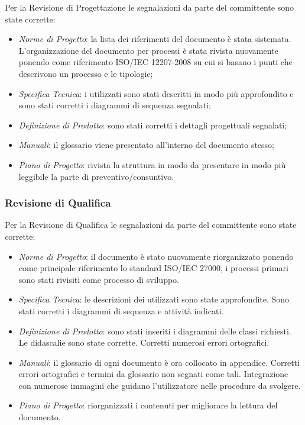 		Per la Revisione di Progettazione le segnalazioni da parte del committente sono state corrette:
		
		\begin{itemize}
			\item \emph{Norme di Progetto}: la lista dei riferimenti del documento è stata sistemata. L'organizzazione del documento per processi è stata rivista nuovamente ponendo come riferimento ISO/IEC 12207-2008 su cui si basano i punti che descrivono un processo e le tipologie;
			\item \emph{Specifica Tecnica}: i  utilizzati sono stati descritti in modo più approfondito e sono stati corretti i diagrammi di sequenza segnalati;
			\item \emph{Definizione di Prodotto}: sono stati corretti i dettagli progettuali segnalati;
			\item \emph{Manuali}: il glossario viene presentato all'interno del documento stesso;
			\item \emph{Piano di Progetto}: rivista la struttura in modo da presentare in modo più leggibile la parte di preventivo/consuntivo.
		\end{itemize}

		\subsubsection{Revisione di Qualifica}
		
		Per la Revisione di Qualifica le segnalazioni da parte del committente sono state corrette:
		
		\begin{itemize}
			\item \emph{Norme di Progetto}: il documento è stato nuovamente riorganizzato ponendo come principale riferimento lo standard ISO/IEC 27000, i processi primari sono stati rivisiti come processo di sviluppo.
			\item \emph{Specifica Tecnica}: le descrizioni dei  utilizzati sono state approfondite. Sono stati corretti i diagrammi di sequenza e attività indicati.
			\item \emph{Definizione di Prodotto}: sono stati inseriti i diagrammi delle classi richiesti. Le didascalie sono state corrette. Corretti numerosi errori ortografici.
			\item \emph{Manuali}: il glossario di ogni documento è ora collocato in appendice. Corretti errori ortografici e termini da glossario non segnati come tali. Integrazione con numerose immagini che guidano l'utilizzatore nelle procedure da svolgere.
			\item \emph{Piano di Progetto}: riorganizzati i contenuti per migliorare la lettura del documento. 
		\end{itemize}


	
